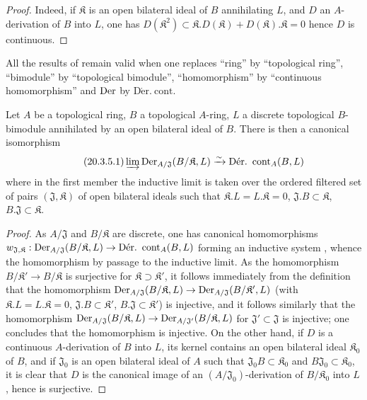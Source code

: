 \begin{proof}
Indeed, if $\mathfrak{K}$ is an open bilateral ideal of $B$ annihilating $L$, and $D$ an $A$-derivation of $B$ into $L$, one has $D(\mathfrak{K}^2)\subset\mathfrak{K}.D(\mathfrak{K})+D(\mathfrak{K}).\mathfrak{K}=0$  hence $D$ is continuous.
\end{proof}

\begin{env}[20.3.4]
\label{0.20.3.4}
All the results of  remain valid when one replaces ``ring'' by ``topological ring'', ``bimodule'' by ``topological bimodule'', ``homomorphism'' by ``continuous homomorphism'' and $\operatorname{Der}$ by $\operatorname{D\acute{e}r.\ cont}$.
\end{env}

\begin{proposition}[20.3.5]
\label{0.20.3.5}
Let $A$ be a topological ring, $B$ a topological $A$-ring, $L$ a discrete topological $B$-bimodule annihilated by an open bilateral ideal of $B$.
There is then a canonical isomorphism
\begin{equation}
\tag{20.3.5.1}
  \label{0.20.3.5.1}
  \varinjlim\Der_{A/\mathfrak{J}}(B/\mathfrak{K},L)\xrightarrow{\sim}\operatorname{D\acute{e}r.\ cont}_A(B,L)
\end{equation}
where in the first member the inductive limit is taken over the ordered filtered set of pairs $(\mathfrak{J},\mathfrak{K})$ of open bilateral ideals such that $\mathfrak{K}.L=L.\mathfrak{K}=0$, $\mathfrak{J}.B\subset\mathfrak{K}$, $B.\mathfrak{J}\subset\mathfrak{K}$.
\end{proposition}

\begin{proof}
As $A/\mathfrak{J}$ and $B/\mathfrak{K}$ are discrete, one has canonical homomorphisms $w_{\mathfrak{J},\mathfrak{K}}:\Der_{A/\mathfrak{J}}(B/\mathfrak{K},L)\to\operatorname{D\acute{e}r.\ cont}_A(B,L)$ forming an inductive system , whence the homomorphism  by passage to the inductive limit.
As the homomorphism $B/\mathfrak{K}'\to B/\mathfrak{K}$ is surjective for $\mathfrak{K}\supset\mathfrak{K}'$, it follows immediately from the definition that the homomorphism $\operatorname{Der}_{A/\mathfrak{J}}(B/\mathfrak{K},L)\to\operatorname{Der}_{A/\mathfrak{J}}(B/\mathfrak{K}',L)$ (with $\mathfrak{K}.L=L.\mathfrak{K}=0$, $\mathfrak{J}.B\subset\mathfrak{K}'$, $B.\mathfrak{J}\subset\mathfrak{K}'$) is injective, and it follows similarly that the homomorphism $\operatorname{Der}_{A/\mathfrak{J}}(B/\mathfrak{K},L)\to\operatorname{Der}_{A/\mathfrak{J}'}(B/\mathfrak{K},L)$ for $\mathfrak{J}'\subset\mathfrak{J}$  is injective; one concludes that the homomorphism  is injective.
On the other hand, if $D$ is a continuous $A$-derivation of $B$ into $L$, its kernel contains an open bilateral ideal $\mathfrak{K}_0$ of $B$, and if $\mathfrak{J}_0$ is an open bilateral ideal of $A$ such that $\mathfrak{J}_0 B\subset\mathfrak{K}_0$ and $B\mathfrak{J}_0\subset\mathfrak{K}_0$, it is clear that $D$ is the canonical image of an $(A/\mathfrak{J}_0)$-derivation of $B/\mathfrak{K}_0$ into $L$, hence  is surjective.
\end{proof}

